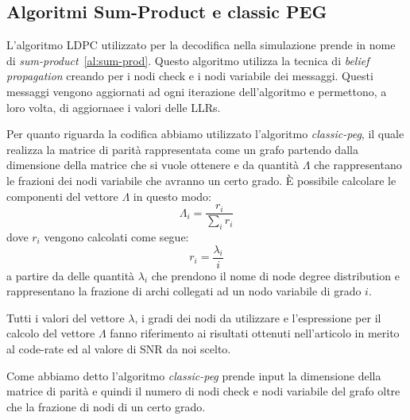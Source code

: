 


\subsection{Algoritmi Sum-Product e classic PEG}\label{subse:algorithms}
L'algoritmo LDPC utilizzato per la decodifica nella simulazione prende in nome di \textit{sum-product}~\ref{al:sum-prod}. Questo algoritmo utilizza la tecnica di \textit{belief propagation} creando per i nodi check e i nodi variabile dei messaggi. Questi messaggi vengono aggiornati ad ogni iterazione dell'algoritmo e permettono, a loro volta, di aggiornaee i valori delle LLRs.

Per quanto riguarda la codifica abbiamo utilizzato l'algoritmo \textit{classic-peg}, il quale realizza la matrice di parit\`a rappresentata come un grafo partendo dalla dimensione della matrice che si vuole ottenere e da quantit\`a $\Lambda$ che rappresentano le frazioni dei nodi variabile che avranno un certo grado. \`E possibile calcolare le componenti del vettore $\Lambda$ in questo modo:
\begin{equation}
\Lambda_i = \frac{r_i}{\sum_i r_i}
\end{equation}
dove $r_i$ vengono calcolati come segue:
\begin{equation}
r_i = \frac{\lambda_i}{i}
\end{equation}
a partire da delle quantit\`a $\lambda_i$ che prendono il nome di node degree distribution e rappresentano la frazione di archi collegati ad un nodo variabile di grado $i$.

Tutti i valori del vettore $\lambda$, i gradi dei nodi da utilizzare e l'espressione per il calcolo del vettore $\Lambda$ fanno riferimento ai risultati ottenuti nell'articolo \cite{e24101463} in merito al code-rate ed al valore di SNR da noi scelto.

Come abbiamo detto l'algoritmo \textit{classic-peg} prende input la dimensione della matrice di parit\`a e quindi il numero di nodi check e nodi variabile del grafo oltre che la frazione di nodi di un certo grado.

